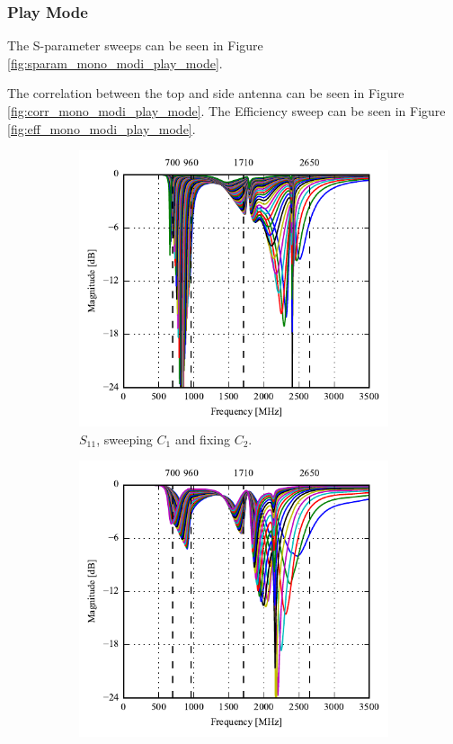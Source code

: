 \FloatBarrier
\subsubsection{Play Mode}
The S-parameter sweeps can be seen in Figure \ref{fig:sparam_mono_modi_play_mode}.

The correlation between the top and side antenna can be seen in Figure \ref{fig:corr_mono_modi_play_mode}.
The Efficiency sweep can be seen in Figure \ref{fig:eff_mono_modi_play_mode}. 
  \begin{figure}[htbp]
    \begin{subfigure}[b]{0.49\linewidth}
      \centering
      \includegraphics{img/tech_sol/monopole/highband/ue/playmode/s11.pdf}
      \caption{$S_{11}$, sweeping $C_1$ and fixing $C_2$.}
    \end{subfigure}
    \hfill
    \begin{subfigure}[b]{0.49\linewidth}
        \centering
        \includegraphics{img/tech_sol/monopole/highband/ue/playmode/s22.pdf}

\end{subfigure}
\end{figure}
